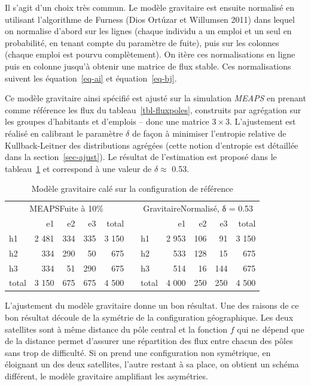 \documentclass[
  10pt,
  a4paper,
  numbers=noendperiod,
  DIV=9]{scrartcl}
\begin{document}
Il s'agit d'un choix très commun. Le modèle gravitaire est ensuite
normalisé en utilisant l'algorithme de Furness (Dios Ortúzar et
Willumsen 2011) dans lequel on normalise d'abord sur les lignes (chaque
individu a un emploi et un seul en probabilité, en tenant compte du
paramètre de fuite), puis sur les colonnes (chaque emploi est pourvu
complètement). On itère ces normalisations en ligne puis en colonne
jusqu'à obtenir une matrice de flux stable. Ces normalisations suivent
les équation~\ref{eq-ai} et équation~\ref{eq-bj}.

Ce modèle gravitaire ainsi spécifié est ajusté sur la simulation
\emph{MEAPS} en prenant comme référence les flux du
tableau~\ref{tbl-fluxpoles}, construits par agrégation sur les groupes
d'habitants et d'emplois -- donc une matrice \(3 \times 3\).
L'ajustement est réalisé en calibrant le paramètre \(\delta\) de façon à
minimiser l'entropie relative de Kullback-Leitner des distributions
agrégées (cette notion d'entropie est détaillée dans la
section~\ref{sec-ajust}). Le résultat de l'estimation est proposé dans
le tableau~\ref{tbl-fluxgrav} et correspond à une valeur de
\(\delta \approx\) 0.53.

\hypertarget{tbl-fluxgrav}{}
\begin{longtable}{lrrrrrlrrrr}
\caption{\label{tbl-fluxgrav}Modèle gravitaire calé sur la configuration de référence }\tabularnewline

\toprule
\multicolumn{5}{c}{MEAPSFuite à 10\%} &  & \multicolumn{5}{c}{GravitaireNormalisé, δ = 0.53} \\ 
\cmidrule(lr){1-5} \cmidrule(lr){7-11}
 & e1 & e2 & e3 & total &   &  & e1 & e2 & e3 & total \\ 
\midrule
h1 & 2 481 & 334 & 335 & 3 150 &  & h1 & 2 953 & 106 & 91 & 3 150 \\ 
h2 & 334 & 290 & 50 & 675 &  & h2 & 533 & 128 & 15 & 675 \\ 
h3 & 334 & 51 & 290 & 675 &  & h3 & 514 & 16 & 144 & 675 \\ 
total & 3 150 & 675 & 675 & 4 500 &  & total & 4 000 & 250 & 250 & 4 500 \\ 
\bottomrule
\end{longtable}

L'ajustement du modèle gravitaire donne un bon résultat. Une des raisons
de ce bon résultat découle de la symétrie de la configuration
géographique. Les deux satellites sont à même distance du pôle central
et la fonction \(f\) qui ne dépend que de la distance permet d'assurer
une répartition des flux entre chacun des pôles sans trop de difficulté.
Si on prend une configuration non symétrique, en éloignant un des deux
satellites, l'autre restant à sa place, on obtient un schéma différent,
le modèle gravitaire amplifiant les asymétries.
\end{document}
